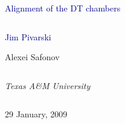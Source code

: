 \documentclass[compress]{beamer}
\begin{document}
\begin{frame}
\vfill
\begin{center}
\textcolor{darkblue}{\Large Alignment of the DT chambers}

\vfill
\begin{columns}
\begin{center}
\large
\textcolor{darkblue}{Jim Pivarski}

\vspace{0.2 cm}
Alexei Safonov
\end{center}
\end{columns}

\begin{columns}
\begin{center}
\scriptsize
{\it Texas A\&M University}
\end{center}
\end{columns}

\vfill
29 January, 2009

\end{center}
\end{frame}


\small
\end{document}
